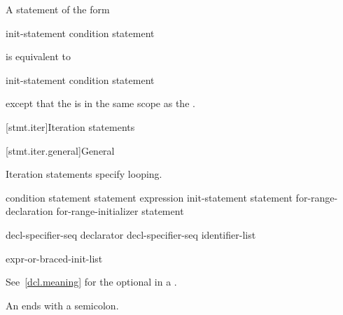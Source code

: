 \pnum
A  statement of the form
\begin{ncsimplebnf}
 \terminal{(} init-statement condition \terminal{)} statement
\end{ncsimplebnf}
is equivalent to
\begin{ncsimplebnf}
\terminal{\{}\br
\bnfindent init-statement\br
\bnfindent {} \terminal{(} condition \terminal{)} statement\br
\terminal{\}}
\end{ncsimplebnf}
except that the  is in
the same scope as the .


[stmt.iter]{Iteration statements}%

[stmt.iter.general]{General}%

\pnum
Iteration statements specify looping.

%
%
%
%
\begin{bnf}
\br
     \terminal{(} condition \terminal{)} statement\br
     statement  \terminal{(} expression \terminal{)} \terminal{;}\br
     \terminal{(} init-statement  \terminal{;}  \terminal{)} statement\br
     \terminal{(}  for-range-declaration \terminal{:} for-range-initializer \terminal{)} statement
\end{bnf}

\begin{bnf}
\br
     decl-specifier-seq declarator\br
     decl-specifier-seq  \terminal{[} identifier-list \terminal{]}
\end{bnf}

\begin{bnf}
\br
    expr-or-braced-init-list
\end{bnf}

See~\ref{dcl.meaning} for the optional  in a
.
\begin{note}
An  ends with a semicolon.
\end{note}

